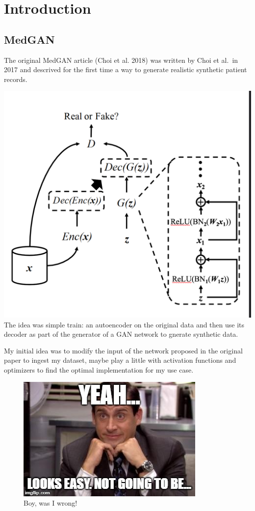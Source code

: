 \documentclass[
  letterpaper,
  DIV=11,
  numbers=noendperiod]{scrreprt}
\begin{document}
\part{Introduction}

\hypertarget{medgan}{%
\chapter{MedGAN}\label{medgan}}

The original MedGAN article (Choi et al. 2018) was written by Choi et
al.~in 2017 and descrived for the first time a way to generate realistic
synthetic patient records.

\includegraphics{MedGan.png} The idea was simple train: an autoencoder
on the original data and then use its decoder as part of the generator
of a GAN network to gnerate synthetic data.

My initial idea was to modify the input of the network proposed in the
original paper to ingest my dataset, maybe play a little with activation
functions and optimizers to find the optimal implementation for my use
case.

\begin{figure}

{\centering \includegraphics{medgan-meme.jpg}

}

\caption{Boy, was I wrong!}

\end{figure}
\end{document}
